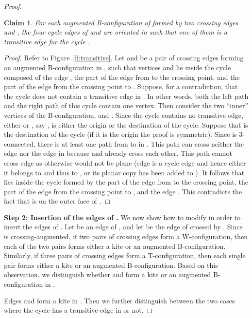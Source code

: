 \documentclass{article}
\newtheorem{claim}{Claim}
\begin{document}
\begin{proof}
\begin{claim}\label{cl:bconf}
For each augmented B-configuration of  formed by two crossing edges  and , the four cycle edges of  and  are oriented in  such that one of them is a transitive edge for the cycle  .
\end{claim}
\begin{proof}
Refer to Figure~\ref{fi:transitive}. Let  and  be a pair of crossing edges forming an augmented B-configuration in , such that vertices  and  lie inside the cycle composed of the edge , the part of the edge  from  to the crossing point, and the part of the edge  from the crossing point to . Suppose, for a contradiction, that the cycle  does not contain a transitive edge in . In other words, both the left path and the right path of this cycle contain one vertex. Then consider the two ``inner'' vertices of the B-configuration,  and . Since the  cycle contains no transitive edge, either  or , say , is either the origin or the destination of the cycle. Suppose that  is the destination of the cycle (if it is the origin the proof is symmetric). Since  is 3-connected, there is at least one path from  to  in . This path can cross neither the edge  nor the edge  in  because  and  already cross each other. This path cannot cross edge  as otherwise  would not be plane (edge  is a cycle edge and hence either it belongs to  and thus to , or its planar copy has been added to ). It follows that  lies inside the cycle formed by the part of the edge  from  to the crossing point, the part of the edge  from the crossing point to , and the edge . This contradicts the fact that  is on the outer face of .
\end{proof}

\smallskip\noindent\textbf{Step 2: Insertion of the edges of .} We now show how to modify  in order to insert the edges of . Let  be an edge of , and let  be the edge of  crossed by . Since  is crossing-augmented, if two pairs of crossing edges form a W-configuration, then each of the two pairs forms either a kite or an augmented B-configuration. Similarly, if three pairs of crossing edges form a T-configuration, then each single pair forms either a kite or an augmented B-configuration. Based on this observation, we distinguish whether  and  form a kite or an augmented B-configuration in . 


\smallskip{}  Edges  and  form a kite in . Then we further distinguish between the two cases where the cycle  has a transitive edge in  or not.



\end{proof}
\end{document}
